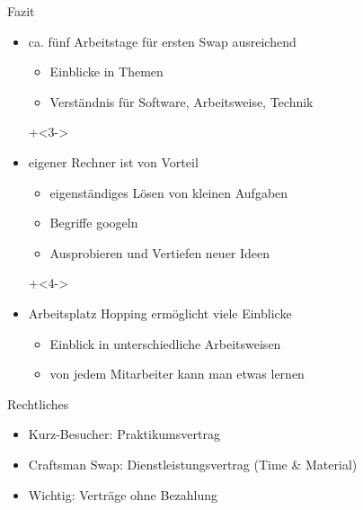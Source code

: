 \begin{frame}{Fazit}
 
\begin{itemize}
\onslide+<2->
\item ca. fünf Arbeitstage für ersten Swap ausreichend
\begin{itemize}
\item Einblicke in Themen
\item Verständnis für Software, Arbeitsweise, Technik
\end{itemize}
 
\onslide+<3->
\item eigener Rechner ist von Vorteil
\begin{itemize}
\item eigenständiges Lösen von kleinen Aufgaben
\item Begriffe googeln
\item Ausprobieren und Vertiefen neuer Ideen
\end{itemize}
 
\onslide+<4->
\item Arbeitsplatz Hopping ermöglicht viele Einblicke
\begin{itemize}
\item Einblick in unterschiedliche Arbeitsweisen
\item von jedem Mitarbeiter kann man etwas lernen
\end{itemize}
 
\end{itemize}
 
\end{frame}


\begin{frame}{Rechtliches}

\begin{itemize}
\item Kurz-Besucher: Praktikumsvertrag

\item Craftsman Swap: Dienstleistungsvertrag (Time \& Material)

\item Wichtig: Verträge ohne Bezahlung

\end{itemize}

\end{frame}


